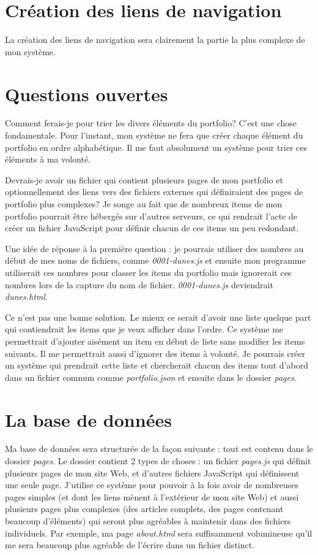 \section{Création des liens de navigation}
La création des liens de navigation sera clairement la partie la plus complexe de mon système.

\clearpage
\section{Questions ouvertes}
Comment ferais-je pour trier les divers éléments du portfolio? C'est une chose fondamentale. Pour l'instant, mon système ne fera que créer chaque élément du portfolio en ordre alphabétique. Il me faut absolument un système pour trier ces éléments à ma volonté.

Devrais-je avoir un fichier qui contient plusieurs pages de mon portfolio et optionnellement des liens vers des fichiers externes qui définiraient des pages de portfolio plus complexes? Je songe au fait que de nombreux items de mon portfolio pourrait être hébergés sur d'autres serveurs, ce qui rendrait l'acte de créer un fichier JavaScript pour définir chacun de ces items un peu redondant.

Une idée de réponse à la première question : je pourrais utiliser des nombres au début de mes noms de fichiers, comme \textit{0001-dunes.js} et ensuite mon programme utiliserait ces nombres pour classer les items du portfolio mais ignorerait ces nombres lors de la capture du nom de fichier. \textit{0001-dunes.js} deviendrait \textit{dunes.html}.

Ce n'est pas une bonne solution. Le mieux ce serait d'avoir une liste quelque part qui contiendrait les items que je veux afficher dans l'ordre. Ce système me permettrait d'ajouter aisément un item en début de liste sans modifier les items suivants. Il me permettrait aussi d'ignorer des items à volonté. Je pourrais créer un système qui prendrait cette liste et chercherait chacun des items tout d'abord dans un fichier commun comme \textit{portfolio.json} et ensuite dans le dossier \textit{pages}.

\clearpage
\section {La base de données}
Ma base de données sera structurée de la façon suivante : tout est contenu dans le dossier \textit{pages}. Le dossier contient 2 types de choses : un fichier \textit{pages.js} qui définit plusieurs pages de mon site Web, et d'autres fichiers JavaScript qui définissent une seule page. J'utilise ce système pour pouvoir à la fois avoir de nombreuses pages simples (et dont les liens mènent à l'extérieur de mon site Web) et aussi plusieurs pages plus complexes (des articles complets, des pages contenant beaucoup d'éléments) qui seront plus agréables à maintenir dans des fichiers individuels. Par exemple, ma page \textit{about.html} sera suffisamment volumineuse qu'il me sera beaucoup plus agréable de l'écrire dans un fichier distinct.

